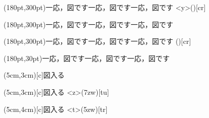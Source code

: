 \documentclass{tarticle}
\begin{document}

\label{layoutcaption}%

\begin{figure}
\layoutfloat(180pt,300pt){一応，図です一応，図です一応，図です}
\layoutcaption<y>(\floatheight)[cr]
\end{figure}

\begin{figure}
\layoutfloat(180pt,300pt){一応，図です一応，図です一応，図です}
\end{figure}

\begin{figure}
\layoutfloat(180pt,300pt){一応，図です一応，図です一応，図です}
\layoutcaption(\floatheight)[cr]
\end{figure}

\begin{figure}
\layoutfloat(180pt,30pt){一応，図です一応，図です一応，図です}
\end{figure}

\begin{figure}[htbp]
\layoutfloat(5cm,3cm)[c]{\centering 図入る}
\end{figure}

\begin{figure}[htbp]
\layoutfloat(5cm,3cm)[c]{\centering 図入る}
\layoutcaption<z>(7zw)[tu]
\end{figure}

\begin{figure}[htbp]
\layoutfloat(5cm,4cm)[c]{\centering 図入る}
\layoutcaption<t>(5zw)[tr]
\end{figure}
\end{document}
